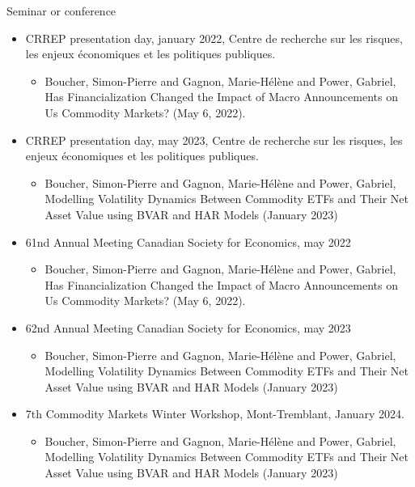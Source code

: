 \documentclass{resume} %
\begin{document}
\begin{rSection}{Seminar or conference}
\begin{itemize}
\item CRREP presentation day, january 2022, Centre de recherche sur les risques, les enjeux économiques et les politiques publiques. 
\begin{itemize}
    \item Boucher, Simon-Pierre and Gagnon, Marie-Hélène and Power, Gabriel, Has Financialization Changed the Impact of Macro Announcements on Us Commodity Markets? (May 6, 2022). 
\end{itemize}
\item CRREP presentation day, may 2023, Centre de recherche sur les risques, les enjeux économiques et les politiques publiques. 
\begin{itemize}
    \item Boucher, Simon-Pierre and Gagnon, Marie-Hélène and Power, Gabriel, Modelling Volatility Dynamics Between Commodity ETFs and Their Net Asset Value using BVAR and HAR Models (January 2023)
\end{itemize}

\item 61nd Annual Meeting
Canadian Society for Economics, may 2022
\begin{itemize}
    \item Boucher, Simon-Pierre and Gagnon, Marie-Hélène and Power, Gabriel, Has Financialization Changed the Impact of Macro Announcements on Us Commodity Markets? (May 6, 2022). 
\end{itemize}
\item 62nd Annual Meeting
Canadian Society for Economics, may 2023
\begin{itemize}
    \item Boucher, Simon-Pierre and Gagnon, Marie-Hélène and Power, Gabriel, Modelling Volatility Dynamics Between Commodity ETFs and Their Net Asset Value using BVAR and HAR Models (January 2023)
\end{itemize}
\item 7th Commodity Markets Winter Workshop, Mont-Tremblant, January 2024.
\begin{itemize}
    \item Boucher, Simon-Pierre and Gagnon, Marie-Hélène and Power, Gabriel, Modelling Volatility Dynamics Between Commodity ETFs and Their Net Asset Value using BVAR and HAR Models (January 2023)
\end{itemize}
\end{itemize}
\end{rSection}
\end{document}
